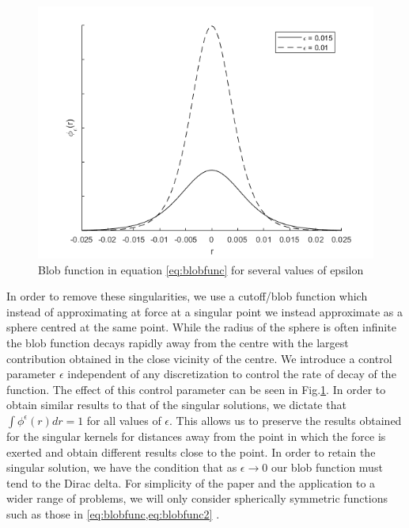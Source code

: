 \begin{figure}
    \centering
    \includegraphics[scale=0.5]{Images/BlobFunction.png}
    \caption{Blob function in equation \cref{eq:blobfunc} for several values of epsilon}
    \label{fig:blobfunc}
\end{figure}

In order to remove these singularities, we use a cutoff/blob function which instead of approximating at force at a singular point we instead approximate as a sphere centred at the same point. While the radius of the sphere is often infinite the blob function decays rapidly away from the centre with the largest contribution obtained in the close vicinity of the centre. We introduce a control parameter $\epsilon$ independent of any discretization to control the rate of decay of the function. The effect of this control parameter can be seen in Fig.\cref{fig:blobfunc}. In order to obtain similar results to that of the singular solutions, we dictate that $\int \phi^\epsilon(r)dr=1$ for all values of $\epsilon$. This allows us to preserve the results obtained for the singular kernels for distances away from the point in which the force is exerted and obtain different results close to the point. In order to retain the singular solution, we have the condition that as $\epsilon \to 0$ our blob function must tend to the Dirac delta. For simplicity of the paper and the application to a wider range of problems, we will only consider spherically symmetric functions such as those in \cref{eq:blobfunc,eq:blobfunc2} \cite{Cortez2005,Olson2013ModelingFormulation,Nguyen2014ReductionFlow}.

